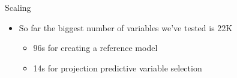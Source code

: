 \documentclass[t]{beamer}
\begin{document}
\begin{frame}{Scaling}

  \begin{itemize}
  \item So far the biggest number of variables we've tested is 22K
    \begin{itemize}
    \item 96s for creating a reference model
    \item 14s for projection predictive variable selection
    \end{itemize}
  \end{itemize}
  
\end{frame}






\end{document}
